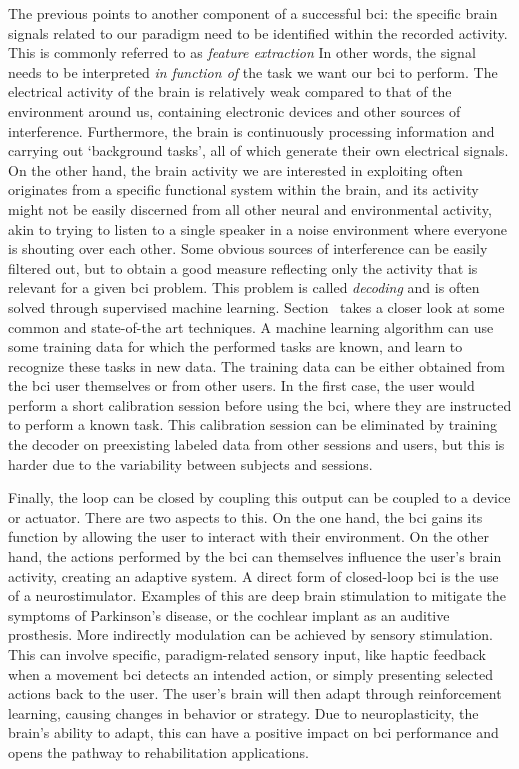 The previous points to another component of a successful \ac{bci}: the specific
brain signals related to our paradigm need to be identified within the recorded
activity.
This is commonly referred to as \emph{feature extraction}
In other words, the signal needs to be interpreted \emph{in function of} the
task we want our \ac{bci} to perform.
The electrical activity of the brain is relatively weak compared to that of the
environment around us, containing electronic devices and other sources of
interference.
Furthermore, the brain is continuously processing information and carrying out
`background tasks', all of which generate their own electrical signals.
On the other hand, the brain activity we are interested in exploiting often
originates from a specific functional system within the brain, and its activity
might not be easily discerned from all other neural and environmental activity,
akin to trying to listen to a single speaker in a noise environment where
everyone is shouting over each other.
Some obvious sources of interference can be easily filtered out, but to obtain
a good measure reflecting only the activity that is relevant for a given \ac{bci}
problem.
This problem is called \emph{decoding} and is often solved through supervised
machine learning.
Section~\label{sec:bci-decoding} takes a closer look at some common and
state-of-the art techniques.
A machine learning algorithm can use some training data for which the performed
tasks are known, and learn to recognize these tasks in new data.
The training data can be either obtained from the \ac{bci} user themselves or from
other users.
In the first case, the user would perform a short calibration session before
using the \ac{bci}, where they are instructed to perform a known task.
This calibration session can be eliminated by training the decoder on
preexisting labeled data from other sessions and users, but this is harder due
to the variability between subjects and sessions.

Finally, the loop can be closed by coupling this output can be coupled to a
device or actuator.
There are two aspects to this.
On the one hand, the \ac{bci} gains its function by allowing the user to interact
with their environment.
On the other hand, the actions performed by the \ac{bci} can themselves influence
the user's brain activity, creating an adaptive system.
A direct form of closed-loop \ac{bci} is the use of a neurostimulator.
Examples of this are deep brain stimulation to mitigate the symptoms of
Parkinson's disease, or the cochlear implant as an auditive prosthesis.
More indirectly modulation can be achieved by sensory stimulation.
This can involve specific, paradigm-related sensory input, like haptic feedback when a
movement \ac{bci} detects an intended action, or simply presenting selected actions
back to the user.
The user's brain will then adapt through reinforcement learning, causing
changes in behavior or strategy.
Due to neuroplasticity, the brain's ability to adapt, this can have a positive
impact on \ac{bci} performance and opens the pathway to rehabilitation applications.

